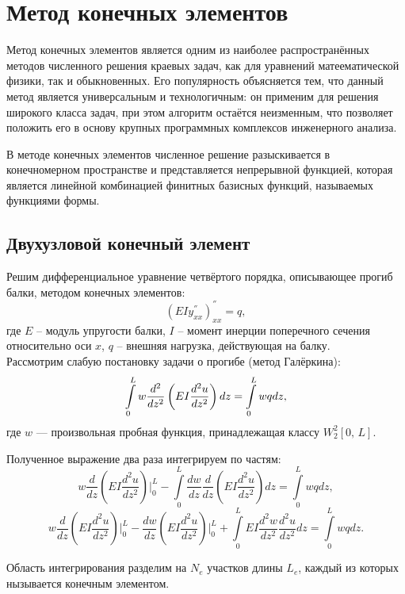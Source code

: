 \documentclass[12pt,a4paper]{article}
\begin{document}
\section{Метод конечных элементов}
Метод конечных элементов является одним из наиболее распространённых методов численного решения краевых задач, как для уравнений матеематической физики, так и обыкновенных. Его популярность объясняется тем, что данный метод является универсальным и технологичным: он применим для решения широкого класса задач, при этом алгоритм остаётся неизменным, что позволяет положить его в основу крупных программных комплексов инженерного анализа. 

В методе конечных элементов численное решение разыскивается в конечномерном пространстве и представляется непрерывной функцией, которая является линейной комбинацией финитных базисных функций, называемых функциями формы. 

\subsection{Двухузловой конечный элемент}
Решим дифференциальное уравнение четвёртого порядка, описывающее прогиб балки, методом конечных элементов:\\
$$(EIy^{''}_{xx})^{''}_{xx}=q,$$%
где $E$ -- модуль упругости балки, $I$ -- момент инерции поперечного сечения относительно оси $x$, $q$ -- внешняя нагрузка, действующая на балку. \\%

Рассмотрим слабую постановку задачи о прогибе (метод Галёркина):\\
\begin{equation}
	\normalsize\int\limits_{0}^{L}w\frac{d^{2}}{dz^{2}}\left(EI\frac{d^{2}u}{dz^{2}}\right)dz=\int\limits_{0}^{L}wqdz,
	\label{beam1}
\end{equation}  
где $w$ --- произвольная пробная функция, принадлежащая классу $W_{2}^{2}[0,\,L]$.
	
Полученное выражение два раза интегрируем по частям: \\
$$w\frac{d}{dz}\left(EI\frac{d^{2}u}{dz^{2}}\right)\bigg|_0^L-\int\limits_{0}^{L}\frac{dw}{dz}\frac{d}{dz}\left(EI\frac{d^{2}u}{dz^{2}}\right)dz=\int\limits_{0}^{L}wqdz,$$
$$w\frac{d}{dz}\left(EI\frac{d^{2}u}{dz^{2}}\right)\bigg|_0^L-\frac{dw}{dz}\left(EI\frac{d^{2}u}{dz^{2}}\right)\bigg|_0^L+\int\limits_{0}^{L}EI\frac{d^{2}w}{dz^{2}}\frac{d^{2}u}{dz^{2}}dz=\int\limits_{0}^{L}wqdz.$$

Область интегрирования разделим на $N_e$ участков длины  $L_e$, каждый из которых нызывается конечным элементом.
\end{document}
